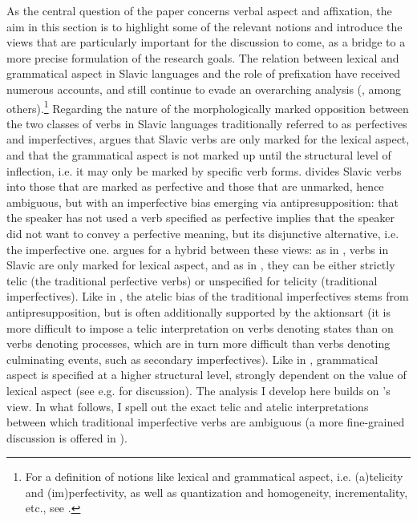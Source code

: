 \documentclass[output=paper]{langscibook}
\begin{document}
As the central question of the paper concerns verbal aspect and affixation, the aim in this section is to highlight some of the relevant notions and introduce the views that are particularly important for the discussion to come, as a bridge to a more precise formulation of the research goals. The relation between lexical and grammatical aspect in Slavic languages and the role of prefixation have received numerous accounts, and still continue to evade an overarching analysis (\cite{Borer.2005, Borik.2006, Ramchand.2004, Arsenij.2006}, among others).\footnote{For a definition of notions like lexical and grammatical aspect, i.e. (a)telicity and (im)per\-fec\-tiv\-i\-ty, as well as quantization and homogeneity, incrementality, etc., see .} Regarding the nature of the morphologically marked opposition between the two classes of verbs in Slavic languages traditionally referred to as perfectives and imperfectives, \citet{Lazor.2010} argues that Slavic verbs are only marked for the lexical aspect, and that the grammatical aspect is not marked up until the structural level of inflection, i.e. it may only be marked by specific verb forms. \citet{Arsenij.2018a} divides Slavic verbs into those that are marked as perfective and those that are unmarked, hence ambiguous, but with an imperfective bias emerging via antipresupposition: that the speaker has not used a verb specified as perfective implies that the speaker did not want to convey a perfective meaning, but its disjunctive alternative, i.e. the imperfective one. \citet{Milosav.dis} argues for a hybrid between these views: as in \citet{Lazor.2010}, verbs in Slavic are only marked for lexical aspect, and as in \citet{Arsenij.2018a}, they can be either strictly telic (the traditional perfective verbs) or unspecified for telicity (traditional imperfectives). Like in \citet{Arsenij.2018a}, the atelic bias of the traditional imperfectives stems from antipresupposition, but is often additionally supported by the aktionsart (it is more difficult to impose a telic interpretation on verbs denoting states than on verbs denoting processes, which are in turn more difficult than verbs denoting culminating events, such as secondary imperfectives). Like in \citet{Lazor.2010}, grammatical aspect is specified at a higher structural level, strongly dependent on the value of lexical aspect (see e.g. \cite{Borik.2006} for discussion). The analysis I develop here builds on \citeauthor{Milosav.dis}'s view. In what follows, I spell out the exact telic and atelic interpretations between which traditional imperfective verbs are ambiguous (a more fine-grained discussion is offered in ). 
\end{document}
